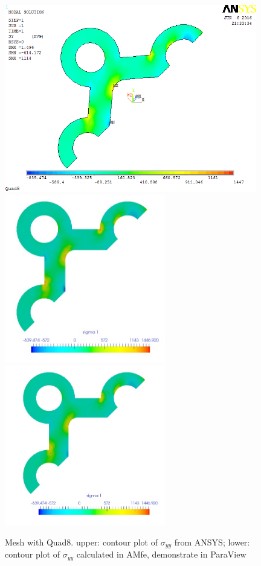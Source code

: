 \begin{figure}[htbp]
	\begin{center}
		\includegraphics[width=11cm,clip]{Quad8_Syy.png} 	
		\includegraphics[width=7cm,clip]{Quad8_Syy_PD.png} 		
		\includegraphics[width=7cm,clip]{Quad8_Syy_P.png} 		
		\caption{Mesh with Quad8. upper: contour plot of $\sigma_{yy}$ from ANSYS; lower: contour plot of $\sigma_{yy}$ calculated in AMfe, demonstrate in ParaView} \label{fig: Quad8_Syy}
	\end{center}
\end{figure}
\clearpage 

